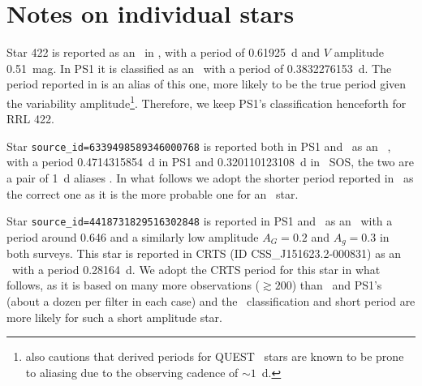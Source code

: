 \documentclass[twocolumn]{aastex63}
\begin{document}
{
\clearpage
\appendix

\section{Notes on individual stars}

Star 422 is reported as an \rrc~in \citet{Vivas2004}, with a period of 0.61925~d and $V$ amplitude 0.51~mag. In PS1 it is classified as an \rrc~with a period of 0.3832276153~d. The period reported in \citet{Vivas2004} is an alias of this one, more likely to be the true period given the variability amplitude\footnote{\citet{Vivas2004} also cautions that derived periods for QUEST \rrc~stars are known to be prone to aliasing due to the observing cadence of $\sim1$~d.}. Therefore, we keep PS1's classification henceforth for RRL 422.

Star \verb+source_id=6339498589346000768+ is reported both in PS1 and \Gaia~as an \rrc~, with a period 0.4714315854~d in PS1 and 0.320110123108~d in \Gaia~SOS, the two are a pair of 1~d aliases \citep[see e.g.]{Lafler1965}. In what follows we adopt the shorter period reported in \Gaia~as the correct one as it is the more probable one for an \rrc~star.

Star \verb+source_id=4418731829516302848+ is reported in PS1 and \Gaia~as an \rrab~with a period around 0.646 and a similarly low amplitude $A_G=0.2$ and $A_g=0.3$ in both surveys. This star is reported in CRTS \citep{Drake2014} (ID CSS\_J151623.2-000831) as an \rrc~with a period 0.28164~d. We adopt the CRTS period for this star in what follows, as it is based on many more observations ($\gtrsim200$) than \Gaia~and PS1's (about a dozen per filter in each case) and the \rrc~classification and short period are more likely for such a short amplitude star.

}
\end{document}
